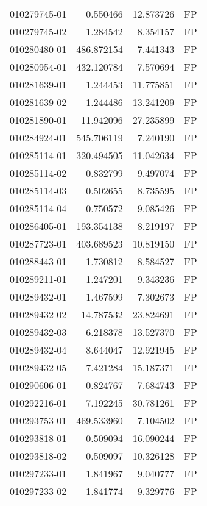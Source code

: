 \begin{tabular}{lrrl}
010279745-01 &    0.550466 &      12.873726 &   FP \\
010279745-02 &    1.284542 &       8.354157 &   FP \\
010280480-01 &  486.872154 &       7.441343 &   FP \\
010280954-01 &  432.120784 &       7.570694 &   FP \\
010281639-01 &    1.244453 &      11.775851 &   FP \\
010281639-02 &    1.244486 &      13.241209 &   FP \\
010281890-01 &   11.942096 &      27.235899 &   FP \\
010284924-01 &  545.706119 &       7.240190 &   FP \\
010285114-01 &  320.494505 &      11.042634 &   FP \\
010285114-02 &    0.832799 &       9.497074 &   FP \\
010285114-03 &    0.502655 &       8.735595 &   FP \\
010285114-04 &    0.750572 &       9.085426 &   FP \\
010286405-01 &  193.354138 &       8.219197 &   FP \\
010287723-01 &  403.689523 &      10.819150 &   FP \\
010288443-01 &    1.730812 &       8.584527 &   FP \\
010289211-01 &    1.247201 &       9.343236 &   FP \\
010289432-01 &    1.467599 &       7.302673 &   FP \\
010289432-02 &   14.787532 &      23.824691 &   FP \\
010289432-03 &    6.218378 &      13.527370 &   FP \\
010289432-04 &    8.644047 &      12.921945 &   FP \\
010289432-05 &    7.421284 &      15.187371 &   FP \\
010290606-01 &    0.824767 &       7.684743 &   FP \\
010292216-01 &    7.192245 &      30.781261 &   FP \\
010293753-01 &  469.533960 &       7.104502 &   FP \\
010293818-01 &    0.509094 &      16.090244 &   FP \\
010293818-02 &    0.509097 &      10.326128 &   FP \\
010297233-01 &    1.841967 &       9.040777 &   FP \\
010297233-02 &    1.841774 &       9.329776 &   FP \\

\end{tabular}
